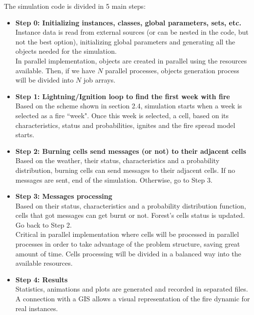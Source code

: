\documentclass[11pt]{article}
\begin{document}
	The simulation code is divided in 5 main steps:
	\begin{itemize}
		\item \textbf{Step 0: Initializing instances, classes, global parameters, sets, etc.} \\
	Instance data is read from external sources (or can be nested in the code, but not the best option), initializing global parameters and generating all the objects needed for the simulation. \\
		
	In parallel implementation, objects are created in parallel using the resources available. Then, if we have $N$ parallel processes, objects generation process will be divided into $N$ job arrays.\\
	
		\item \textbf{Step 1: Lightning/Ignition loop to find the first week with fire} \\
	Based on the scheme shown in section 2.4, simulation starts when a week is selected as a fire ``week". Once this week is selected, a cell,  based on its characteristics, status and probabilities, ignites and the fire spread model starts. \\
		\item \textbf{Step 2: Burning cells send messages (or not) to their  adjacent cells} \\
	Based on the weather, their status, characteristics and a probability distribution, burning cells can send messages to their adjacent cells. If no messages are sent, end of the simulation. Otherwise, go to Step 3.\\
		\item \textbf{Step 3: Messages processing}	\\
	Based on their status, characteristics and a probability distribution function, cells that got messages can get burnt or not. Forest's cells status is updated. Go back to Step 2. \\
		
	Critical in parallel implementation where cells will be processed in parallel processes in order to take advantage of the problem structure, saving great amount of time. Cells processing will be divided in a balanced way into the available resources.\\
		\item \textbf{Step 4: Results} \\
	Statistics, animations and plots are generated and recorded in separated files. A connection with a GIS allows a visual representation of the fire dynamic for real instances. \\
	

\end{itemize}
\end{document}
